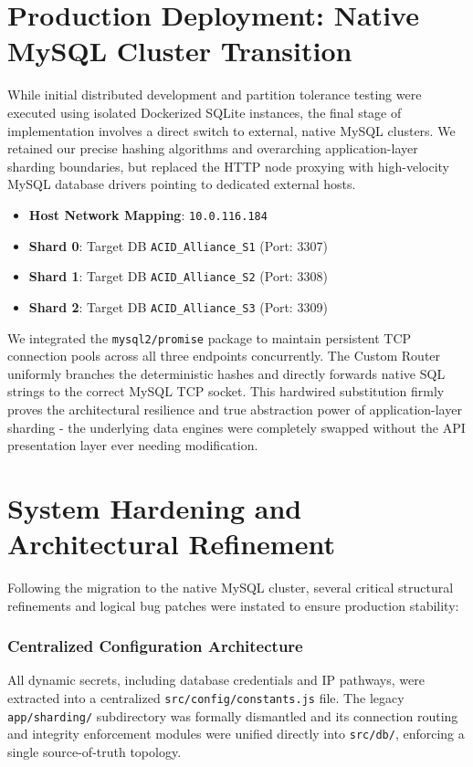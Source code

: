 \documentclass[sigconf]{acmart}
\begin{document}
\section{Production Deployment: Native MySQL Cluster Transition}

While initial distributed development and partition tolerance testing were executed using isolated Dockerized SQLite instances, the final stage of implementation involves a direct switch to external, native MySQL clusters. We retained our precise hashing algorithms and overarching application-layer sharding boundaries, but replaced the HTTP node proxying with high-velocity MySQL database drivers pointing to dedicated external hosts.

\begin{itemize}[leftmargin=*]
    \item \textbf{Host Network Mapping}: \texttt{10.0.116.184}
    \item \textbf{Shard 0}: Target DB \texttt{ACID\_Alliance\_S1} (Port: 3307)
    \item \textbf{Shard 1}: Target DB \texttt{ACID\_Alliance\_S2} (Port: 3308)
    \item \textbf{Shard 2}: Target DB \texttt{ACID\_Alliance\_S3} (Port: 3309)
\end{itemize}

We integrated the \texttt{mysql2/promise} package to maintain persistent TCP connection pools across all three endpoints concurrently. The Custom Router uniformly branches the deterministic hashes and directly forwards native SQL strings to the correct MySQL TCP socket. This hardwired substitution firmly proves the architectural resilience and true abstraction power of application-layer sharding - the underlying data engines were completely swapped without the API presentation layer ever needing modification.

\section{System Hardening and Architectural Refinement}

Following the migration to the native MySQL cluster, several critical structural refinements and logical bug patches were instated to ensure production stability:

\subsubsection{Centralized Configuration Architecture}
All dynamic secrets, including database credentials and IP pathways, were extracted into a centralized \texttt{src/config/constants.js} file. The legacy \texttt{app/sharding/} subdirectory was formally dismantled and its connection routing and integrity enforcement modules were unified directly into \texttt{src/db/}, enforcing a single source-of-truth topology.
\end{document}
